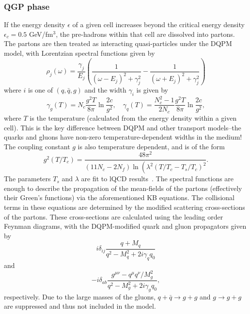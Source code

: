 \subsubsection{QGP phase}
If the energy density $\epsilon$ of a given cell increases beyond the critical energy density $\epsilon_c = 0.5$ GeV/fm$^3$, the pre-hadrons within that cell are dissolved into partons. The partons are then treated as interacting quasi-particles under the DQPM~\cite{DQPM} model, with Lorentzian spectral functions given by
\begin{equation}
\rho_j(\omega)=\frac{\gamma_j}{E_j}\left(\frac{1}{\left(\omega-E_j\right)^2+\gamma_j^2}-\frac{1}{\left(\omega+E_j\right)^2+\gamma_j^2}\right)
\end{equation}
where $i$ is one of $(q, \bar{q}, g)$ and the width $\gamma_i$ is given by
\begin{equation}
\gamma_g(T)=N_c \frac{g^2 T}{8 \pi} \ln \frac{2 c}{g^2}, \quad \gamma_q(T)=\frac{N_c^2-1}{2 N_c} \frac{g^2 T}{8 \pi} \ln \frac{2 c}{g^2},
\end{equation}
where $T$ is the temperature (calculated from the energy density within a given cell). This is the key difference between DQPM and other transport models--the quarks and gluons have non-zero temperature-dependent widths in the medium! The coupling constant $g$ is also temperature dependent, and is of the form
\begin{equation}
    g^2\left(T / T_c\right)=\frac{48 \pi^2}{\left(11 N_c-2 N_f\right) \ln \left(\lambda^2\left(T / T_c-T_s / T_c\right)^2\right.}.
\end{equation}
The parameters $T_s$ and $\lambda$ are fit to lQCD results~\cite{PHSD2}. The spectral functions are enough to describe the propagation of the mean-fields of the partons (effectively their Green's functions) via the aforementioned KB equations. The collisional terms in these equations are determined by the modified scattering cross-sections of the partons. These cross-sections are calculated using the leading order Feynman diagrams, with the DQPM-modified quark and gluon propagators given by
\begin{equation}
    i \delta_{i j} \frac{q+M_q}{q^2-M_q^2+2 i \gamma_q q_0}
\end{equation}
and
\begin{equation}
    -i \delta_{a b} \frac{g^{\mu \nu}-q^\mu q^\nu / M_g^2}{q^2-M_g^2+2 i \gamma_g q_0},
\end{equation}
respectively. Due to the large masses of the gluons, $q + \bar{q} \rightarrow g + g$ and $g \rightarrow g + g$ are suppressed and thus not included in the model.

